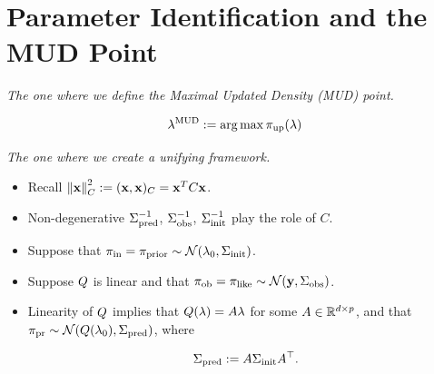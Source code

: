 \section{Parameter Identification and the MUD Point}

\begin{frame}{\it The one where we define the Maximal Updated Density (MUD) point.}

\begin{equation}\label{eq:mudpt_inital_defn}
	\lambda^{\text{MUD}} := \operatorname*{arg\,max} {\operatorname*{\pi_{up}}}(\lambda)
\end{equation}

\end{frame}

\begin{frame}[t]{\it The one where we create a unifying framework.}

\begin{itemize}
  \item Recall $\left\Vert\mathbf{x}\right\Vert_C^2 := (\mathbf{x}, \mathbf{x})_C = \mathbf{x}^T C \mathbf{x}$. \\

  \bigskip
  \item Non-degenerative $\Sigma_\text{pred}^{-1}$, $\Sigma_\text{obs}^{-1}$, $\Sigma_\text{init}^{-1}$ play the role of $C$. \\

  \bigskip
  \bigskip
  \item Suppose that $\operatorname*{\pi_{in}} = \operatorname*{\pi_{prior}} \sim \mathcal{N}(\lambda_0, \Sigma_\text{init})$.

  \bigskip
  \item Suppose $Q$ is linear and that $\operatorname*{\pi_{ob}} = \pi_\text{like} \sim \mathcal{N}(\mathbf{y}, \Sigma_\text{obs})$.

  \bigskip
  \bigskip
  \item Linearity of $Q$ implies that $Q(\lambda)=A\lambda$ for some $A\in\mathbb{R}^{d\times p}$, and that $\operatorname*{\pi_{pr}} \sim \mathcal{N}(Q(\lambda_0), \Sigma_\text{pred})$, where

  \begin{equation}\label{eq:predictCov}
  	\Sigma_\text{pred} := A\Sigma_\text{init} A^\top.
  \end{equation}

\end{itemize}


\end{frame}

